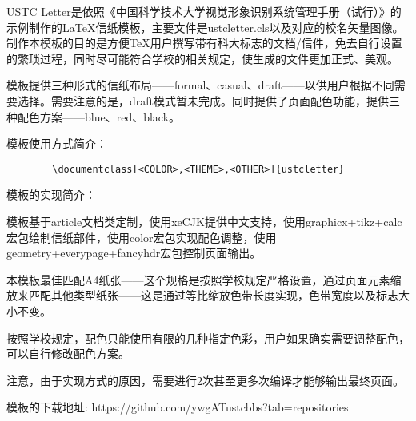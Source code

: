 \documentclass[blue,normal,12pt]{ustcletter}
\begin{document}
\tableofcontents
\thispagestyle{empty}
\newpage

\pagestyle{fancy}
\setcounter{page}{1}
\fancyhead{}
\fancyfoot[C]{\thepage/\pageref{totalPage}}

USTC Letter是依照《中国科学技术大学视觉形象识别系统管理手册（试行）》的示例制作的LaTeX信纸模板，主要文件是ustcletter.cls以及对应的校名矢量图像。制作本模板的目的是方便TeX用户撰写带有科大标志的文档/信件，免去自行设置的繁琐过程，同时尽可能符合学校的相关规定，使生成的文件更加正式、美观。

模板提供三种形式的信纸布局——formal、casual、draft——以供用户根据不同需要选择。需要注意的是，draft模式暂未完成。同时提供了页面配色功能，提供三种配色方案——blue、red、black。

模板使用方式简介：
\begin{verbatim}
        \documentclass[<COLOR>,<THEME>,<OTHER>]{ustcletter}
\end{verbatim}


模板的实现简介：

模板基于article文档类定制，使用xeCJK提供中文支持，使用graphicx+tikz+calc宏包绘制信纸部件，使用color宏包实现配色调整，使用geometry+everypage+fancyhdr宏包控制页面输出。

本模板最佳匹配A4纸张——这个规格是按照学校规定严格设置，通过页面元素缩放来匹配其他类型纸张——这是通过等比缩放色带长度实现，色带宽度以及标志大小不变。

按照学校规定，配色只能使用有限的几种指定色彩，用户如果确实需要调整配色，可以自行修改配色方案。

注意，由于实现方式的原因，需要进行2次甚至更多次编译才能够输出最终页面。

模板的下载地址:
https://github.com/ywgATustcbbs?tab=repositories

~

~

\lipsum[1-10]

\label{totalPage}
\end{document}
